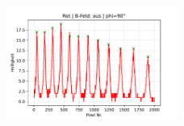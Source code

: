       \begin{figure}
        \centering
        \includegraphics[width=0.5\textwidth]{content/grafiken/rot ohne magnet 90 gimbplot.pdf}
        \caption{}
        \label{fig:rom90}
      \end{figure}
\onecolumn